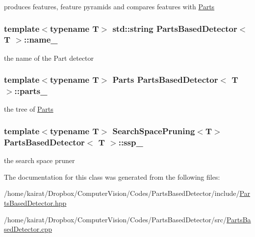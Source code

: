 produces features, feature pyramids and compares features with \hyperlink{classParts}{Parts} 

\hypertarget{classPartsBasedDetector_a776c766541fb4c2974c6b40a8f4f1c2f}{}
\subsubsection[{name\+\_\+}]{\setlength{\rightskip}{0pt plus 5cm}template$<$typename T$>$ std\+::string {\bf Parts\+Based\+Detector}$<$ T $>$\+::name\+\_\+\hspace{0.3cm}{\ttfamily [private]}}\label{classPartsBasedDetector_a776c766541fb4c2974c6b40a8f4f1c2f}


the name of the Part detector 

\hypertarget{classPartsBasedDetector_ad548ec9214858535eb6a0f3783d11664}{}
\subsubsection[{parts\+\_\+}]{\setlength{\rightskip}{0pt plus 5cm}template$<$typename T$>$ {\bf Parts} {\bf Parts\+Based\+Detector}$<$ T $>$\+::parts\+\_\+\hspace{0.3cm}{\ttfamily [private]}}\label{classPartsBasedDetector_ad548ec9214858535eb6a0f3783d11664}


the tree of \hyperlink{classParts}{Parts} 

\hypertarget{classPartsBasedDetector_aae91c693f9d01e3e6cbd552d7f81e474}{}
\subsubsection[{ssp\+\_\+}]{\setlength{\rightskip}{0pt plus 5cm}template$<$typename T$>$ {\bf Search\+Space\+Pruning}$<$T$>$ {\bf Parts\+Based\+Detector}$<$ T $>$\+::ssp\+\_\+\hspace{0.3cm}{\ttfamily [private]}}\label{classPartsBasedDetector_aae91c693f9d01e3e6cbd552d7f81e474}


the search space pruner 



The documentation for this class was generated from the following files\+:\begin{DoxyCompactItemize}
\item 
/home/kairat/\+Dropbox/\+Computer\+Vision/\+Codes/\+Parts\+Based\+Detector/include/\hyperlink{PartsBasedDetector_8hpp}{Parts\+Based\+Detector.\+hpp}\item 
/home/kairat/\+Dropbox/\+Computer\+Vision/\+Codes/\+Parts\+Based\+Detector/src/\hyperlink{PartsBasedDetector_8cpp}{Parts\+Based\+Detector.\+cpp}\end{DoxyCompactItemize}
